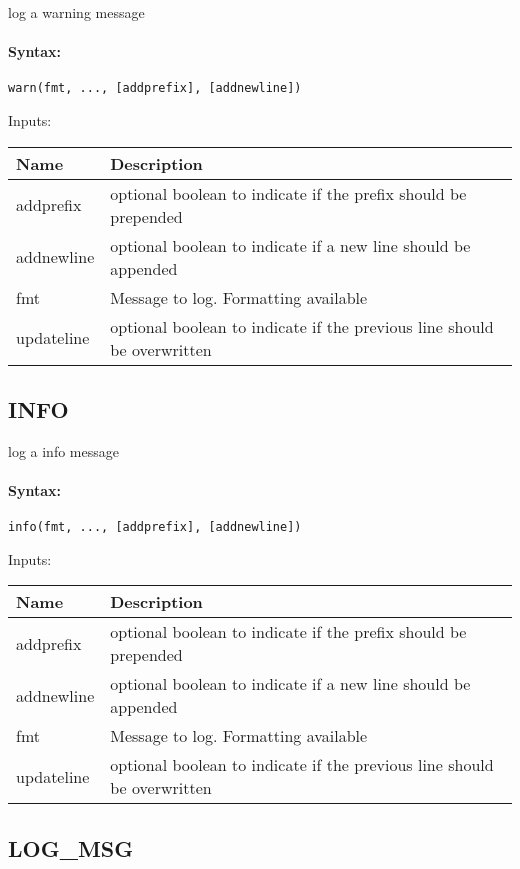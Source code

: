log a warning message

\paragraph{Syntax:} \verb|warn(fmt, ..., [addprefix], [addnewline])|

\bigskip
Inputs:

\begin{tabular}{|p{}|p{}|}
\hline
\textbf{Name} & \textbf{Description} \\
\hline \hline
addprefix & optional boolean to indicate if the prefix should be prepended  \\ \hline
addnewline & optional boolean to indicate if a new line should be appended  \\ \hline
fmt & Message to log. Formatting available  \\ \hline
updateline & optional boolean to indicate if the previous line should be overwritten  \\ \hline
\end{tabular}


\subsection{INFO}

log a info message

\paragraph{Syntax:} \verb|info(fmt, ..., [addprefix], [addnewline])|

\bigskip
Inputs:

\begin{tabular}{|p{}|p{}|}
\hline
\textbf{Name} & \textbf{Description} \\
\hline \hline
addprefix & optional boolean to indicate if the prefix should be prepended  \\ \hline
addnewline & optional boolean to indicate if a new line should be appended  \\ \hline
fmt & Message to log. Formatting available  \\ \hline
updateline & optional boolean to indicate if the previous line should be overwritten  \\ \hline
\end{tabular}


\subsection{LOG\_MSG}

